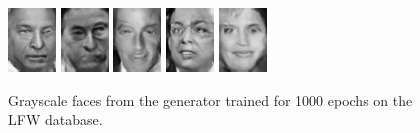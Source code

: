 \begin{figure}[!h]
{        \includegraphics[scale=1]{figures/lfw/appendix2/lfw64x48bw_image0043.png}
        \includegraphics[scale=1]{figures/lfw/appendix2/lfw64x48bw_image0044.png}
        \includegraphics[scale=1]{figures/lfw/appendix2/lfw64x48bw_image0045.png}
        \includegraphics[scale=1]{figures/lfw/appendix2/lfw64x48bw_image0046.png}
        \includegraphics[scale=1]{figures/lfw/appendix2/lfw64x48bw_image0047.png}
    }
    \caption{\label{fig:appendix-lfw2}Grayscale faces from the generator trained for 1000 epochs on the LFW database.}
\end{figure}

